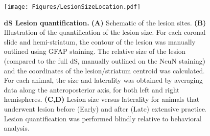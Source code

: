 \begin{figure}[h!]
 \begin{center}
	\texttt{[image: Figures/LesionSizeLocation.pdf]}
	\caption
	{\textbf{dS Lesion quantification.}
	\textbf{(A)} Schematic of the lesion sites.
	\textbf{(B)} Illustration of the quantification of the lesion size. For each coronal slide and hemi-striatum, the contour of the lesion was manually outlined using GFAP staining.
	The relative size of the lesion (compared to the full dS, manually outlined on the NeuN staining) and the coordinates of the lesion/striatum centroid was calculated.
	For each animal, the size and laterality was obtained by averaging data along the anteroposterior axis, for both left and right hemispheres.
	\textbf{(C,D)} Lesion size versus laterality for animals that underwent lesion before (Early) and after (Late) extensive practice.
	Lesion quantification was performed blindly relative to behavioral analysis.
	}
	\label{sfig2}
 \end{center}
\end{figure}
